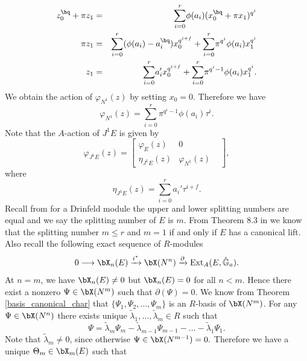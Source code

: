 \documentclass{amsart}
\numberwithin {equation}{section}
\begin{document}
\begin{eqnarray*}
z_{0}^{\hq}+\pi z_{1}&=& \displaystyle{\sum_{i=0}^{r}} \phi(a_{i})(x_{0}^{\hq}+\pi x_{1})^{q^{i}}\\
 \pi z_{1}&=& \displaystyle{\sum_{i=0}^{r}} (\phi(a_{i})-a_{i}^{\hq})x_{0}^{q^{i+f}}+\displaystyle{\sum_{i=0}^{r}} \pi^{q^{i}}\phi(a_{i})x_{1}^{q^{i}}\\
 z_{1}&=&\displaystyle{\sum_{i=0}^{r}} a_{i}'x_{0}^{q^{i+f}}+\displaystyle{\sum_{i=0}^{r}} \pi^{q^{i}-1}\phi(a_{i})x_{1}^{q^{i}}.
\end{eqnarray*}
We obtain the action of $\varphi_{N^{1}}(z)$ by setting $x_{0}=0$. Therefore we have
\begin{equation}\label{action_N^1_Drin}
\varphi_{N^{1}}(z)=\displaystyle{\sum_{i=0}^{r}}\pi^{q^{i}-1}\phi(a_{i})\tau^{i} .  
\end{equation} 
Note that the $A$-action of $J^{1}E$ is given by 
\[
\varphi_{J^{1}E}(z)=
\begin{bmatrix}
   \varphi_{E}(z)  & 0  \\
    \eta_{J^{1}E}(z) & \varphi_{N^{1}}(z)  & 
     
\end{bmatrix},
\]
where 
\begin{equation}\label{bider_1}
\eta_{J^{1}E}(z)=\displaystyle{\sum_{i=0}^{r}} a_{i}'\tau^{i+f}.  
\end{equation}
Recall from \cite{BS b} for a Drinfeld module the upper and lower splitting numbers are equal and we say the splitting number of $E$ is $m$. From Theorem 8.3 in \cite{BS b} we know that the splitting number $m\leq r$ and $m=1$ if and only if $E$ has a canonical lift. 
Also recall the following exact sequence of $R$-modules
\begin{equation}\label{eqn_Ext}
0\longrightarrow {\bX}_{n}(E) \xrightarrow{i^{*}} {\bX}(N^{n})\xrightarrow{\partial} \mathrm{Ext}_{A}(E,\hat{\mathbb{G}}_{a}).
\end{equation}
At $n=m$, we have ${\bX}_{n}(E)\neq 0$ but ${\bX}_{n}(E)=0$ for all $n<m$. Hence there exist a nonzero $\Psi\in {\bX}(N^{m})$ such that $\partial(\Psi)=0$.  We know from Theorem \ref{basis_canonical_char} that $\{\Psi_{1},\Psi_{2},\ldots,\Psi_{m}\}$ is an $R$-basis of ${\bX}(N^{m})$. For any $\Psi \in \bX(N^n)$ 
there exists unique $\tilde{\lambda}_{1},\ldots,\tilde{\lambda}_{m}\in R$ such that $$\Psi=\tilde{\lambda}_{m}\Psi_{m}-\tilde{\lambda}_{m-1}\Psi_{m-1}-\ldots -\tilde{\lambda}_{1}\Psi_{1}. $$
Note that $\tilde{\lambda}_{m}\neq 0$, since otherwise $\Psi\in {\bX}(N^{m-1})={0}.$ Therefore we have a unique $\Theta_{m}\in {\bX}_{m}(E)$ such that
\end{document}
